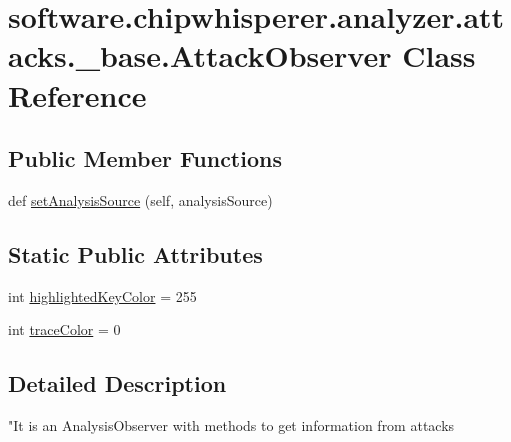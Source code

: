 \hypertarget{classsoftware_1_1chipwhisperer_1_1analyzer_1_1attacks_1_1__base_1_1AttackObserver}{}\section{software.\+chipwhisperer.\+analyzer.\+attacks.\+\_\+base.\+Attack\+Observer Class Reference}
\label{classsoftware_1_1chipwhisperer_1_1analyzer_1_1attacks_1_1__base_1_1AttackObserver}
\subsection*{Public Member Functions}
\begin{DoxyCompactItemize}
\item 
def \hyperlink{classsoftware_1_1chipwhisperer_1_1analyzer_1_1attacks_1_1__base_1_1AttackObserver_a867c135415209bd6770c56b7ca920692}{set\+Analysis\+Source} (self, analysis\+Source)
\end{DoxyCompactItemize}
\subsection*{Static Public Attributes}
\begin{DoxyCompactItemize}
\item 
int \hyperlink{classsoftware_1_1chipwhisperer_1_1analyzer_1_1attacks_1_1__base_1_1AttackObserver_ab86a6c174ddb208b7513e02d7087fd31}{highlighted\+Key\+Color} = 255
\item 
int \hyperlink{classsoftware_1_1chipwhisperer_1_1analyzer_1_1attacks_1_1__base_1_1AttackObserver_ad2992486563d90329cfad44a8965b67b}{trace\+Color} = 0
\end{DoxyCompactItemize}


\subsection{Detailed Description}
\begin{DoxyVerb}"It is an AnalysisObserver with methods to get information from attacks\end{DoxyVerb}
 

